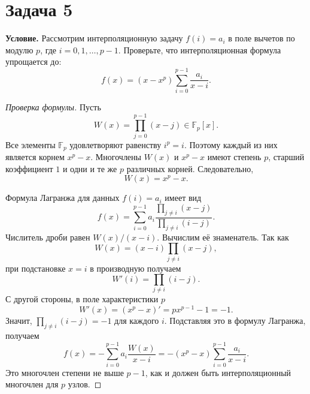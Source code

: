 \documentclass[12pt]{article}
\begin{document}
	\section*{Задача 5}

	\noindent
	\textbf{Условие.} Рассмотрим интерполяционную задачу
	$f(i)=a_i$ в поле вычетов по модулю $p$, где
	$i=0,1,\ldots,p-1$. Проверьте, что интерполяционная формула упрощается до:
	\[
		f(x)=(x-x^p)\sum_{i=0}^{p-1}\frac{a_i}{x-i}.
	\]

	\begin{proof}[Проверка формулы]
		Пусть
		\[
			W(x)=\prod_{j=0}^{p-1}(x-j)\in\mathbb F_p[x].
		\]
		Все элементы $\mathbb F_p$ удовлетворяют равенству $i^p=i$.
		Поэтому каждый из них является корнем $x^p-x$. Многочлены
		$W(x)$ и $x^p-x$ имеют степень $p$, старший коэффициент $1$
		и одни и те же $p$ различных корней. Следовательно,
		\[
			W(x)=x^p-x.
		\]

		Формула Лагранжа для данных $f(i)=a_i$ имеет вид
		\[
			f(x)=
			\sum_{i=0}^{p-1}
				a_i
				\frac{\displaystyle\prod_{j\ne i}(x-j)}
				     {\displaystyle\prod_{j\ne i}(i-j)}.
		\]
		Числитель дроби равен $W(x)/(x-i)$. Вычислим её знаменатель.
		Так как
		\[
			W(x)=(x-i)\prod_{j\ne i}(x-j),
		\]
		при подстановке $x=i$ в производную получаем
		\[
			W'(i)=\prod_{j\ne i}(i-j).
		\]
		С другой стороны, в поле характеристики $p$
		\[
			W'(x)=(x^p-x)'=p x^{p-1}-1=-1.
		\]
		Значит, $\prod_{j\ne i}(i-j)=-1$ для каждого $i$.
		Подставляя это в формулу Лагранжа, получаем
		\[
			f(x)
				=-\sum_{i=0}^{p-1}a_i\frac{W(x)}{x-i}
				=-(x^p-x)\sum_{i=0}^{p-1}\frac{a_i}{x-i}.
		\]
		Это многочлен степени не выше $p-1$, как и должен быть
		интерполяционный многочлен для $p$ узлов.
	\end{proof}
\end{document}
